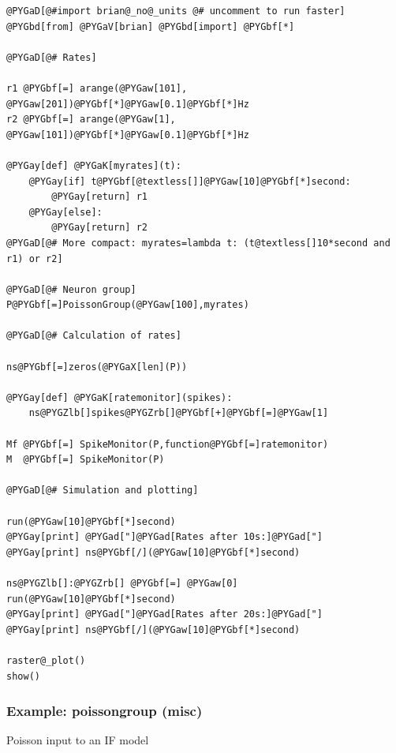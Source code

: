 \documentclass[letterpaper,10pt,english]{manual}
\begin{document}
\begin{Verbatim}[commandchars=@\[\]]
@PYGaD[@#import brian@_no@_units @# uncomment to run faster]
@PYGbd[from] @PYGaV[brian] @PYGbd[import] @PYGbf[*]

@PYGaD[@# Rates]

r1 @PYGbf[=] arange(@PYGaw[101], @PYGaw[201])@PYGbf[*]@PYGaw[0.1]@PYGbf[*]Hz
r2 @PYGbf[=] arange(@PYGaw[1], @PYGaw[101])@PYGbf[*]@PYGaw[0.1]@PYGbf[*]Hz

@PYGay[def] @PYGaK[myrates](t):
    @PYGay[if] t@PYGbf[@textless[]]@PYGaw[10]@PYGbf[*]second:
        @PYGay[return] r1
    @PYGay[else]:
        @PYGay[return] r2
@PYGaD[@# More compact: myrates=lambda t: (t@textless[]10*second and r1) or r2]

@PYGaD[@# Neuron group]
P@PYGbf[=]PoissonGroup(@PYGaw[100],myrates)

@PYGaD[@# Calculation of rates]

ns@PYGbf[=]zeros(@PYGaX[len](P))

@PYGay[def] @PYGaK[ratemonitor](spikes):
    ns@PYGZlb[]spikes@PYGZrb[]@PYGbf[+]@PYGbf[=]@PYGaw[1]

Mf @PYGbf[=] SpikeMonitor(P,function@PYGbf[=]ratemonitor)
M  @PYGbf[=] SpikeMonitor(P)

@PYGaD[@# Simulation and plotting]

run(@PYGaw[10]@PYGbf[*]second)
@PYGay[print] @PYGad["]@PYGad[Rates after 10s:]@PYGad["]
@PYGay[print] ns@PYGbf[/](@PYGaw[10]@PYGbf[*]second)

ns@PYGZlb[]:@PYGZrb[] @PYGbf[=] @PYGaw[0]
run(@PYGaw[10]@PYGbf[*]second)
@PYGay[print] @PYGad["]@PYGad[Rates after 20s:]@PYGad["]
@PYGay[print] ns@PYGbf[/](@PYGaw[10]@PYGbf[*]second)

raster@_plot()
show()
\end{Verbatim}

\resetcurrentobjects
\hypertarget{--doc-examples-misc_poissongroup}{}

\hypertarget{index-79}{}\subsubsection{Example: poissongroup (misc)}

Poisson input to an IF model
\end{document}
